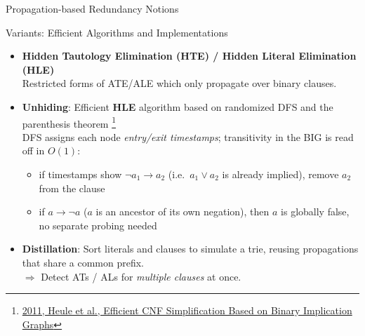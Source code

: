 \documentclass[t]{sdqbeamer}
\begin{document}
\begin{frame}{Propagation-based Redundancy Notions}
\begin{block}{Variants: Efficient Algorithms and Implementations}
\begin{itemize}\setlength{\itemsep}{1em}
    \item \textbf{Hidden Tautology Elimination (HTE) / Hidden Literal Elimination (HLE)}\\[3pt]
    Restricted forms of ATE/ALE which only propagate over binary clauses.\\[3pt]
    \item \textbf{Unhiding}: Efficient \textbf{HLE} algorithm based on randomized DFS and the parenthesis theorem%
    \footnote{\href{https://link.springer.com/chapter/10.1007/978-3-642-21581-0_17}{2011, Heule et al., Efficient CNF Simplification Based on Binary Implication Graphs}}\\[3pt]
    DFS assigns each node \emph{entry/exit timestamps}; transitivity in the BIG is read off in $O(1)$:
    \begin{itemize}\setlength{\itemsep}{2pt}
        \item {} if timestamps show $\lnot a_1 \to a_2$\; (i.e.\ $a_1 \lor a_2$ is already implied), remove $a_2$ from the clause
        \item {} if $a \to \lnot a$ ($a$ is an ancestor of its own negation), then $a$ is globally false, no separate probing needed
    \end{itemize}
    \item \textbf{Distillation}:
    Sort literals and clauses to simulate a trie, reusing propagations that share a common prefix.\\[3pt]
    $\Rightarrow$ Detect ATs / ALs for \emph{multiple clauses} at once.\\
\end{itemize}
\end{block}
\end{frame}
\end{document}
